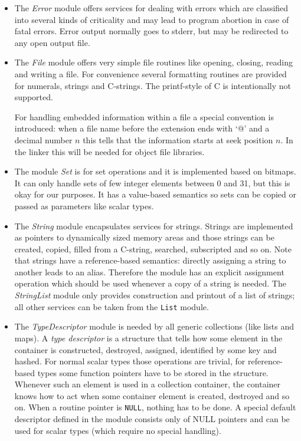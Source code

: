 \documentclass[10pt]{article}
\newcommand{\code}[1]{{\lstset{basicstyle=\normalsize\ttfamily}\lstinline!#1!}}
\newcommand{\definition}[1]{\emph{#1}}
\begin{document}
\begin{itemize}
  \item The \definition{Error} module offers services for dealing with
        errors which are classified into several kinds of criticality
        and may lead to program abortion in case of fatal errors.
        Error output normally goes to stderr, but may be redirected to
        any open output file.

  \item The \definition{File} module offers very simple file routines
        like opening, closing, reading and writing a file.  For
        convenience several formatting routines are provided for
        numerals, strings and C-strings.  The printf-style of C is
        intentionally not supported.

        For handling embedded information within a file a special
        convention is introduced: when a file name before the
        extension ends with `@' and a decimal number \(n\) this tells
        that the information starts at seek position \(n\).  In the
        linker this will be needed for object file libraries.

  \item The module \definition{Set} is for set operations and it is
        implemented based on bitmaps.  It can only handle sets of few
        integer elements between 0 and 31, but this is okay for our
        purposes.  It has a value-based semantics so sets can be
        copied or passed as parameters like scalar types.

  \item The \definition{String} module encapsulates services for
        strings.  Strings are implemented as pointers to dynamically
        sized memory areas and those strings can be created, copied,
        filled from a C-string, searched, subscripted and so on.  Note
        that strings have a reference-based semantics: directly
        assigning a string to another leads to an alias.  Therefore
        the module has an explicit assignment operation which should
        be used whenever a copy of a string is needed.  The
        \definition{StringList} module only provides construction and
        printout of a list of strings; all other services can be taken
        from the \code{List} module.

  \item The \definition{TypeDescriptor} module is needed by all
        generic collections (like lists and maps).  A \definition{type
        descriptor} is a structure that tells how some element in the
        container is constructed, destroyed, assigned, identified by
        some key and hashed.  For normal scalar types those operations
        are trivial, for reference-based types some function pointers
        have to be stored in the structure.  Whenever such an element
        is used in a collection container, the container knows how to
        act when some container element is created, destroyed and so
        on.  When a routine pointer is \code{NULL}, nothing has to be
        done.  A special default descriptor defined in the module
        consists only of NULL pointers and can be used for scalar
        types (which require no special handling).


\end{itemize}
\end{document}
